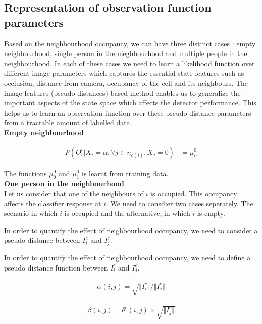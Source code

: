 \documentclass[10pt,twocolumn,letterpaper]{article}
\begin{document}
\subsection{Representation of observation function parameters}

Based on the neighbourhood occupancy, we can have three distinct cases : empty neighbourhood, single person in the nieghbourhood and multiple people in the neighbourhood. In each of these cases we need to learn a likelihood function over different image parameters which captures the essential state features such as occlusion, distance from camera, occupancy of the cell and its neighbours. The image features (pseudo distances) based method enables us to generalize the important aspects of the state space which affects the detector performance. This helps us to learn an observation function over these pseudo distance parameters from a tractable amount of labelled data.\\

\textbf{Empty neighbourhood}

\begin{align}
 P(O^{c}_{i} |X_{i}=\alpha ,\forall j \in{n_{c(i)}},X_{j} =0)  &=\mu^{0}_{\alpha}
\end{align}

The functions $ \mu^{0}_{0} $  and $ \mu^{0}_{1} $ is learnt from training data. \\

\textbf{One person in the neighbourhood}\\
Let us consider that one of the neighbours of $ i$ is occupied. This occupancy affects the classifier response at $ i$. We need to consdier two cases seperately. The scenario in which $ i $ is occupied and the alternative, in which $ i$ is empty.

In order to quantify the effect of neighbourhood occupancy, we need to consider a pseudo distance between $I_{i}^{c}$ and $I_{j}^{c}$.
 
In order to quantify the effect of neighbourhood occupancy, we need to define a pseudo distance function between $I_{i}^{c}$ and $I_{j}^{c}$.

\begin{align}
\alpha(i,j) = \sqrt{\Vert I_{i}^{c}\Vert/\Vert I_{j}^{c}\Vert}
\end{align}

\begin{align}
\beta(i,j) = \delta^{c} (i,j)\times \sqrt{\Vert I_{j}^{c}\Vert}
\end{align}
 
\end{document}

